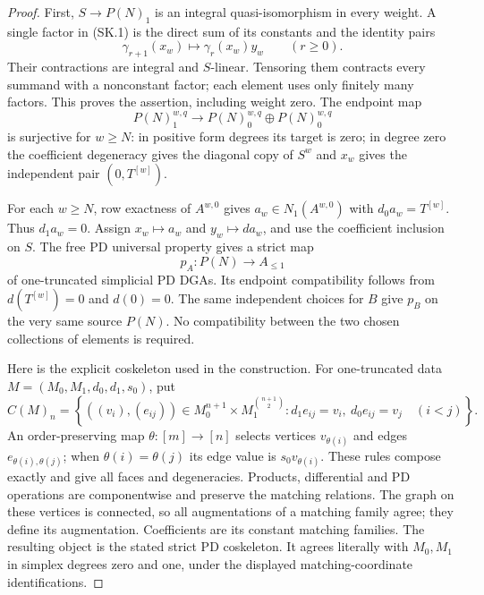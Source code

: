 \begin{proof}
First, $S\to P(N)_1$ is an integral quasi-isomorphism in every
weight. A single factor in (SK.1) is the direct sum of its constants
and the identity pairs
\[
              \gamma_{r+1}(x_w)\longmapsto\gamma_r(x_w)y_w
                       \qquad(r\geq0).
 \tag{SK.5}
\]
Their contractions are integral and $S$-linear. Tensoring them
contracts every summand with a nonconstant factor; each element
uses only finitely many factors. This proves the assertion,
including weight zero. The endpoint map
\[
               P(N)_1^{w,q}\longrightarrow
                       P(N)_0^{w,q}\oplus P(N)_0^{w,q}
 \tag{SK.6}
\]
is surjective for $w\geq N$: in positive form degrees its target
is zero; in degree zero the coefficient degeneracy gives the
diagonal copy of $S^w$ and $x_w$ gives the independent pair
$(0,T^{[w]})$.

For each $w\geq N$, row exactness of $A^{w,0}$ gives
$a_w\in N_1(A^{w,0})$ with $d_0a_w=T^{[w]}$.
Thus $d_1a_w=0$. Assign $x_w\mapsto a_w$ and
$y_w\mapsto da_w$, and use the coefficient inclusion on $S$.
The free PD universal property gives a strict map
\[
                  p_A:P(N)\longrightarrow A_{\leq1}
 \tag{SK.7}
\]
of one-truncated simplicial PD DGAs. Its endpoint compatibility
follows from $d(T^{[w]})=0$ and $d(0)=0$.
The same independent choices for $B$ give $p_B$ on the very same
source $P(N)$. No compatibility between the two chosen collections
of elements is required.

Here is the explicit coskeleton used in the construction. For
one-truncated data $M=(M_0,M_1,d_0,d_1,s_0)$, put
\[
 C(M)_n=\left\{((v_i),(e_{ij}))\in
       M_0^{n+1}\times M_1^{\binom{n+1}{2}}:
       d_1e_{ij}=v_i,\ d_0e_{ij}=v_j\quad(i<j)\right\}.
 \tag{SK.8}
\]
An order-preserving map $\theta:[m]\to[n]$ selects vertices
$v_{\theta(i)}$ and edges $e_{\theta(i),\theta(j)}$; when
$\theta(i)=\theta(j)$ its edge value is $s_0v_{\theta(i)}$.
These rules compose exactly and give all faces and degeneracies.
Products, differential and PD operations are componentwise and
preserve the matching relations. The graph on these vertices is
connected, so all augmentations of a matching family agree;
they define its augmentation. Coefficients are its constant matching
families. The resulting object is the stated strict PD coskeleton.
It agrees literally with $M_0,M_1$ in simplex degrees zero and one,
under the displayed matching-coordinate identifications.


\end{proof}
